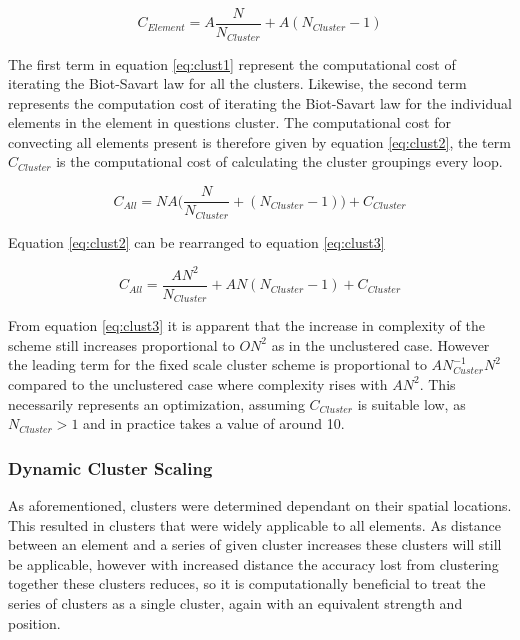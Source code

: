 \begin{equation}
\label{eq:clust1}
C_{Element}=A\frac{N}{N_{Cluster}}+A(N_{Cluster}-1)
\end{equation}

The first term in equation \ref{eq:clust1} represent the computational cost of iterating the Biot-Savart law for all the clusters. Likewise, the second term represents the computation cost of iterating the Biot-Savart law for the individual elements in the element in questions cluster. The computational cost for convecting all elements present is therefore given by equation \ref{eq:clust2}, the term $C_{Cluster}$ is the computational cost of calculating the cluster groupings every loop.

\begin{equation}
\label{eq:clust2}
C_{All}=NA\Big(\frac{N}{N_{Cluster}}+(N_{Cluster}-1)\Big)+C_{Cluster}
\end{equation}

Equation \ref{eq:clust2} can be rearranged to equation \ref{eq:clust3}

\begin{equation}
\label{eq:clust3}
C_{All}=\frac{AN^2}{N_{Cluster}}+AN(N_{Cluster}-1)+C_{Cluster}
\end{equation}

From equation \ref{eq:clust3} it is apparent that the increase in complexity of the scheme still increases proportional to $ON^2$ as in the unclustered case. However the leading term for the fixed scale cluster scheme is proportional to $AN^{-1}_{Custer}N^2$ compared to the unclustered case where complexity rises with $AN^2$. This necessarily represents an optimization, assuming $C_{Cluster}$ is suitable low, as $N_{Cluster}>1$ and in practice takes a value of around 10.

\subsubsection{Dynamic Cluster Scaling}
As aforementioned, clusters were determined dependant on their spatial locations. This resulted in clusters that were widely applicable to all elements. As distance between an element and a series of given cluster increases these clusters will still be applicable, however with increased distance the accuracy lost from clustering together these clusters  reduces, so it is computationally beneficial to treat the series of clusters as a single cluster, again with an equivalent strength and position.

